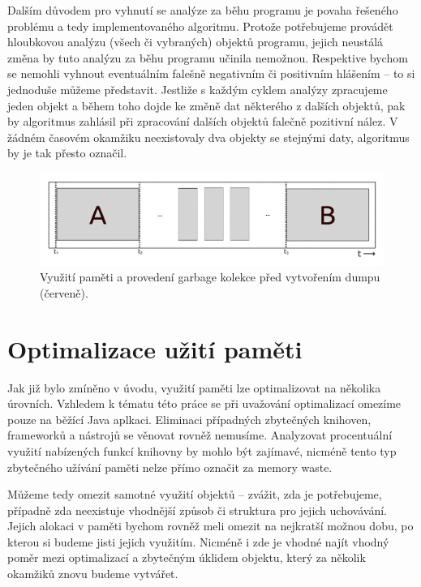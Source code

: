 Dalším důvodem pro vyhnutí se analýze za běhu programu je povaha řešeného problému a tedy implementovaného algoritmu. Protože potřebujeme provádět hloubkovou analýzu (všech či vybraných) objektů programu, jejich neustálá změna by tuto analýzu za běhu programu učinila nemožnou. Respektive bychom se nemohli vyhnout eventuálním falešně negativním či positivním hlášením -- to si jednoduše můžeme představit. Jestliže s každým cyklem analýzy zpracujeme jeden objekt a během toho dojde ke změně dat některého z dalších objektů, pak by algoritmus zahlásil při zpracování dalších objektů falečně pozitivní nález. V žádném časovém okamžiku neexistovaly dva objekty se stejnými daty, algoritmus by je tak přesto označil.


\begin{figure}[h]
	\centering
	\includegraphics[scale=0.5]{obrazky/runtime-analysis.png}
	\caption{Využití paměti a provedení garbage kolekce před vytvořením dumpu (červeně).}
	\label{obr2}
\end{figure}






\chapter{Optimalizace užití paměti}

Jak již bylo zmíněno v úvodu, využití paměti lze optimalizovat na několika úrovních. Vzhledem k tématu této práce se při uvažování optimalizací omezíme pouze na běžící Java aplkaci. Eliminaci případných zbytečných knihoven, frameworků a nástrojů se věnovat rovněž nemusíme. Analyzovat procentuální využití nabízených funkcí knihovny by mohlo být zajímavé, nicméně tento typ zbytečného užívání paměti nelze přímo označit za memory waste.

Můžeme tedy omezit samotné využití objektů -- zvážit, zda je potřebujeme, případně zda neexistuje vhodnější způsob či struktura pro jejich uchovávání. Jejich alokaci v paměti bychom rovněž meli omezit na nejkratší možnou dobu, po kterou si budeme jisti jejich využitím. Nicméně i zde je vhodné najít vhodný poměr mezi optimalizací a zbytečným úklidem objektu, který za několik okamžiků znovu budeme vytvářet.

